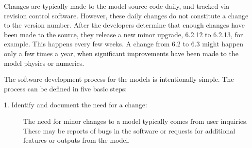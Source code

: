 \documentclass[11pt]{book}
\begin{document}
Changes are typically made to the model source code daily, and tracked via revision control software. However, these daily changes do not constitute a change to the version number. After the developers determine that enough changes have been made to the source, they release a new minor upgrade, 6.2.12 to 6.2.13, for example. This happens every few weeks. A change from 6.2 to 6.3 might happen only a few times a year, when significant improvements have been made to the model physics or numerics.

The software development process for the models is intentionally simple. The process can be defined in five basic steps:

\begin{description}
\item [1. Identify and document the need for a change:] The need for minor changes to a model typically comes from user inquiries. These may be reports of bugs in the software or requests for additional features or outputs from the model.


\end{description}
\end{document}

